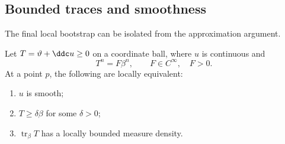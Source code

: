\subsection{Bounded traces and smoothness}\label{sec:interior-criterion}

The final local bootstrap can be isolated from the approximation argument.

\begin{proposition}\label{prop:interior-criterion}
Let $T=\vartheta+\ddc u\geq0$ on a coordinate ball, where $u$ is continuous and
\begin{equation}\label{eq:interior-local-ma}
  T^n=F\beta^n,
  \qquad F\in C^\infty,\quad F>0.
\end{equation}
At a point $p$, the following are locally equivalent:
\begin{enumerate}
\item $u$ is smooth;
\item $T\geq\delta\beta$ for some $\delta>0$;
\item $\operatorname{tr}_\beta T$ has a locally bounded measure density.
\end{enumerate}
\end{proposition}

